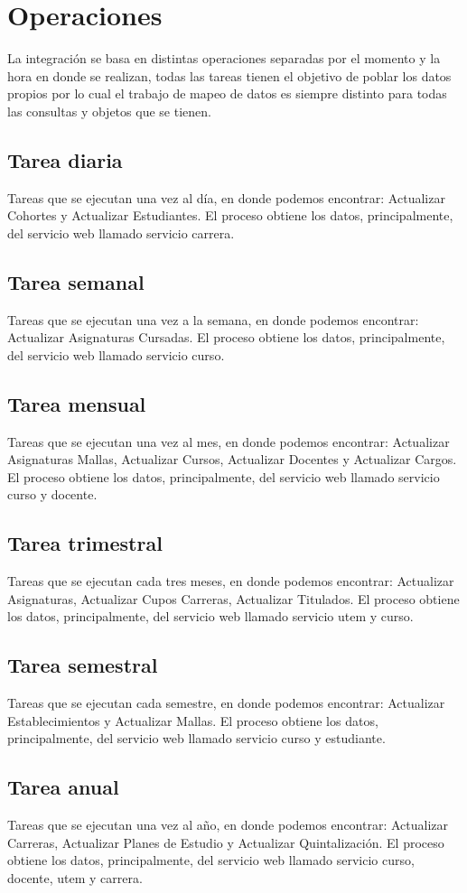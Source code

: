 \documentclass[a4paper,12pt,openany,oneside]{book}
\begin{document}
\section{Operaciones}
La integración se basa en distintas operaciones separadas por el momento y la hora en donde se realizan, todas las tareas tienen el objetivo de poblar los datos propios por lo cual el trabajo de mapeo de datos es siempre distinto para todas las consultas y objetos que se tienen.
\subsection{Tarea diaria}
Tareas que se ejecutan una vez al día, en donde podemos encontrar: Actualizar Cohortes y Actualizar Estudiantes. El proceso obtiene los datos, principalmente, del servicio web llamado servicio carrera.
\subsection{Tarea semanal}
Tareas que se ejecutan una vez a la semana, en donde podemos encontrar: Actualizar Asignaturas Cursadas. El proceso obtiene los datos, principalmente, del servicio web llamado servicio curso.
\subsection{Tarea mensual}
Tareas que se ejecutan una vez al mes, en donde podemos encontrar: Actualizar Asignaturas Mallas, Actualizar Cursos, Actualizar Docentes y Actualizar Cargos. El proceso obtiene los datos, principalmente, del servicio web llamado servicio curso y docente.
\subsection{Tarea trimestral}
Tareas que se ejecutan cada tres meses, en donde podemos encontrar: Actualizar Asignaturas, Actualizar Cupos Carreras, Actualizar Titulados. El proceso obtiene los datos, principalmente, del servicio web llamado servicio utem y curso.
\subsection{Tarea semestral}
Tareas que se ejecutan cada semestre, en donde podemos encontrar: Actualizar Establecimientos y Actualizar Mallas. El proceso obtiene los datos, principalmente, del servicio web llamado servicio curso y estudiante.
\subsection{Tarea anual}
Tareas que se ejecutan una vez al año, en donde podemos encontrar: Actualizar Carreras, Actualizar Planes de Estudio y Actualizar Quintalización. El proceso obtiene los datos, principalmente, del servicio web llamado servicio curso, docente, utem y carrera.
\end{document}
